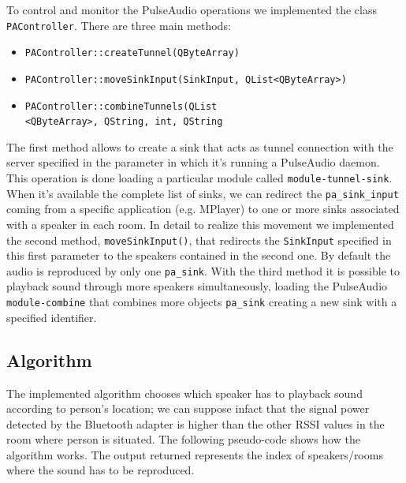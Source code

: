 \documentclass[conference]{IEEEtran}
\begin{document}
To control and monitor the PulseAudio operations we implemented the class \texttt{PAController}. There are three main methods:
\begin{itemize}
\item \texttt{PAController::createTunnel(QByteArray)}
\item \texttt{PAController::moveSinkInput(SinkInput, QList<QByteArray>)}
\item \texttt{PAController::combineTunnels(QList \\
<QByteArray>, QString, int, QString}
\end{itemize}
The first method allows to create a sink that acts as tunnel connection with the server specified in the parameter in which it's running a PulseAudio daemon. This operation is done loading a particular module called \texttt{module-tunnel-sink}. When it's available the complete list of sinks, we can redirect the \texttt{pa\_sink\_input} coming from a specific application (e.g. MPlayer) to one or more sinks associated with a speaker in each room. In detail to realize this movement we implemented the second method, \texttt{moveSinkInput()}, that redirects the \texttt{SinkInput} specified in this first parameter to the speakers contained in the second one.
By default the audio is reproduced by only one \texttt{pa\_sink}. With the third method it is possible to playback sound through more speakers simultaneously, loading the PulseAudio \texttt{module-combine} that combines more objects \texttt{pa\_sink} creating a new sink with a specified identifier.

\subsection{Algorithm}
The implemented algorithm chooses which speaker has to playback sound according to person's location; we can suppose infact that the signal power detected by the Bluetooth adapter is higher than the other RSSI values in the room where person is situated. The following pseudo-code shows how the algorithm works. The output returned represents the index of speakers/rooms where the sound has to be reproduced.
\end{document}
